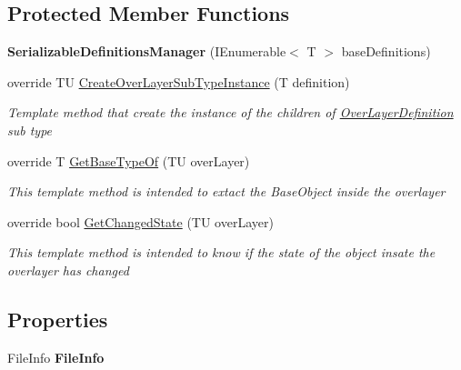 \subsection*{Protected Member Functions}
\begin{DoxyCompactItemize}
\item 
\hypertarget{class_s_e_mod_a_p_i_1_1_a_p_i_1_1_definitions_1_1_serializable_definitions_manager_a36828980149d9fb3c1c932a3f0f0ae02}{}{\bfseries Serializable\+Definitions\+Manager} (I\+Enumerable$<$ T $>$ base\+Definitions)\label{class_s_e_mod_a_p_i_1_1_a_p_i_1_1_definitions_1_1_serializable_definitions_manager_a36828980149d9fb3c1c932a3f0f0ae02}

\item 
override T\+U \hyperlink{class_s_e_mod_a_p_i_1_1_a_p_i_1_1_definitions_1_1_serializable_definitions_manager_a5a6feef34189c4bab3cdb18c8950b3af}{Create\+Over\+Layer\+Sub\+Type\+Instance} (T definition)
\begin{DoxyCompactList}\small\item\em Template method that create the instance of the children of \hyperlink{class_s_e_mod_a_p_i_1_1_a_p_i_1_1_definitions_1_1_over_layer_definition}{Over\+Layer\+Definition} sub type \end{DoxyCompactList}\item 
override T \hyperlink{class_s_e_mod_a_p_i_1_1_a_p_i_1_1_definitions_1_1_serializable_definitions_manager_a4a342f45c20f68beb0627cdd9069eb0d}{Get\+Base\+Type\+Of} (T\+U over\+Layer)
\begin{DoxyCompactList}\small\item\em This template method is intended to extact the Base\+Object inside the overlayer \end{DoxyCompactList}\item 
override bool \hyperlink{class_s_e_mod_a_p_i_1_1_a_p_i_1_1_definitions_1_1_serializable_definitions_manager_a8de7735d985f86672940b3ec7019fdb2}{Get\+Changed\+State} (T\+U over\+Layer)
\begin{DoxyCompactList}\small\item\em This template method is intended to know if the state of the object insate the overlayer has changed \end{DoxyCompactList}\end{DoxyCompactItemize}
\subsection*{Properties}
\begin{DoxyCompactItemize}
\item 
\hypertarget{class_s_e_mod_a_p_i_1_1_a_p_i_1_1_definitions_1_1_serializable_definitions_manager_ada0aa3bc0874b52a1ac9867dfe4ef1af}{}File\+Info {\bfseries File\+Info}\label{class_s_e_mod_a_p_i_1_1_a_p_i_1_1_definitions_1_1_serializable_definitions_manager_ada0aa3bc0874b52a1ac9867dfe4ef1af}

\end{DoxyCompactItemize}


